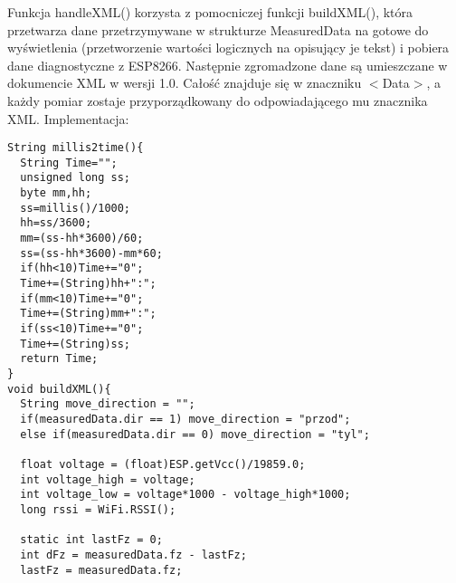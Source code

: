 \documentclass[a4paper,12pt,twoside,openany]{report}
\begin{document}
Funkcja handleXML() korzysta z pomocniczej funkcji buildXML(), która przetwarza dane przetrzymywane w strukturze MeasuredData na gotowe do wyświetlenia (przetworzenie wartości logicznych na opisujący je tekst) i pobiera dane diagnostyczne z ESP8266. Następnie zgromadzone dane są umieszczane w dokumencie XML w wersji 1.0. Całość znajduje się w znaczniku $<$Data$>$, a każdy pomiar zostaje przyporządkowany do odpowiadającego mu znacznika XML. Implementacja:\\
\begin{lstlisting}[style=customcpp]
String millis2time(){
  String Time="";
  unsigned long ss;
  byte mm,hh;
  ss=millis()/1000;
  hh=ss/3600;
  mm=(ss-hh*3600)/60;
  ss=(ss-hh*3600)-mm*60;
  if(hh<10)Time+="0";
  Time+=(String)hh+":";
  if(mm<10)Time+="0";
  Time+=(String)mm+":";
  if(ss<10)Time+="0";
  Time+=(String)ss;
  return Time;
}
void buildXML(){  
  String move_direction = "";
  if(measuredData.dir == 1) move_direction = "przod";
  else if(measuredData.dir == 0) move_direction = "tyl";

  float voltage = (float)ESP.getVcc()/19859.0;
  int voltage_high = voltage;
  int voltage_low = voltage*1000 - voltage_high*1000;
  long rssi = WiFi.RSSI();

  static int lastFz = 0;
  int dFz = measuredData.fz - lastFz;
  lastFz = measuredData.fz;
  

\end{lstlisting}
\end{document}
